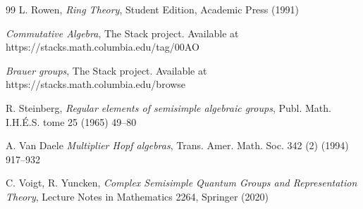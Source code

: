 \documentclass[11pt]{amsart}
\begin{document}
\begin{thebibliography}{99}
 L. Rowen, {\it Ring Theory}, Student Edition, Academic Press (1991)

 {\em Commutative Algebra}, The Stack project. Available at https://stacks.math.columbia.edu/tag/00AO

 {\it Brauer groups}, The Stack project. Available at https://stacks.math.columbia.edu/browse

 R. Steinberg, {\it Regular elements of semisimple algebraic groups}, Publ. Math. I.H.É.S. tome 25 (1965) 49--80

 A. Van Daele {\it Multiplier Hopf algebras}, Trans. Amer. Math. Soc. 342 (2) (1994) 917--932

 C. Voigt, R. Yuncken, {\it Complex Semisimple Quantum Groups and Representation Theory}, Lecture Notes in Mathematics 2264, Springer (2020)
\end{thebibliography}
\end{document}
